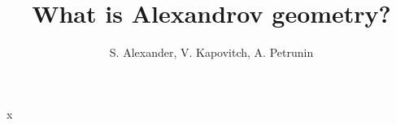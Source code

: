 \documentclass[twoside]{book}
\begin{document}
\frontmatter
\title{What is Alexandrov geometry?}
\author{S. Alexander, V. Kapovitch, A. Petrunin}
\maketitle
x






 
\end{document}
